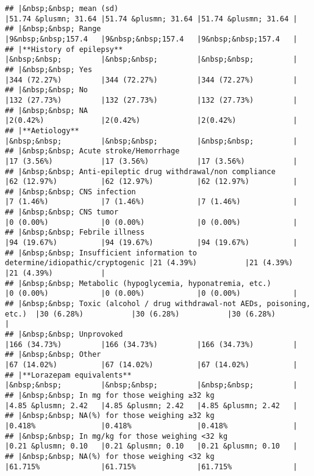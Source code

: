 \documentclass[
]{article}
\begin{document}
\begin{verbatim}
## |&nbsp;&nbsp; mean (sd)                                                    |51.74 &plusmn; 31.64 |51.74 &plusmn; 31.64 |51.74 &plusmn; 31.64 |
## |&nbsp;&nbsp; Range                                                        |9&nbsp;&nbsp;157.4   |9&nbsp;&nbsp;157.4   |9&nbsp;&nbsp;157.4   |
## |**History of epilepsy**                                                   |&nbsp;&nbsp;         |&nbsp;&nbsp;         |&nbsp;&nbsp;         |
## |&nbsp;&nbsp; Yes                                                          |344 (72.27%)         |344 (72.27%)         |344 (72.27%)         |
## |&nbsp;&nbsp; No                                                           |132 (27.73%)         |132 (27.73%)         |132 (27.73%)         |
## |&nbsp;&nbsp; NA                                                           |2(0.42%)             |2(0.42%)             |2(0.42%)             |
## |**Aetiology**                                                             |&nbsp;&nbsp;         |&nbsp;&nbsp;         |&nbsp;&nbsp;         |
## |&nbsp;&nbsp; Acute stroke/Hemorrhage                                      |17 (3.56%)           |17 (3.56%)           |17 (3.56%)           |
## |&nbsp;&nbsp; Anti-epileptic drug withdrawal/non compliance                |62 (12.97%)          |62 (12.97%)          |62 (12.97%)          |
## |&nbsp;&nbsp; CNS infection                                                |7 (1.46%)            |7 (1.46%)            |7 (1.46%)            |
## |&nbsp;&nbsp; CNS tumor                                                    |0 (0.00%)            |0 (0.00%)            |0 (0.00%)            |
## |&nbsp;&nbsp; Febrile illness                                              |94 (19.67%)          |94 (19.67%)          |94 (19.67%)          |
## |&nbsp;&nbsp; Insufficient information to determine/idiopathic/cryptogenic |21 (4.39%)           |21 (4.39%)           |21 (4.39%)           |
## |&nbsp;&nbsp; Metabolic (hypoglycemia, hyponatremia, etc.)                 |0 (0.00%)            |0 (0.00%)            |0 (0.00%)            |
## |&nbsp;&nbsp; Toxic (alcohol / drug withdrawal-not AEDs, poisoning, etc.)  |30 (6.28%)           |30 (6.28%)           |30 (6.28%)           |
## |&nbsp;&nbsp; Unprovoked                                                   |166 (34.73%)         |166 (34.73%)         |166 (34.73%)         |
## |&nbsp;&nbsp; Other                                                        |67 (14.02%)          |67 (14.02%)          |67 (14.02%)          |
## |**Lorazepam equivalents**                                                 |&nbsp;&nbsp;         |&nbsp;&nbsp;         |&nbsp;&nbsp;         |
## |&nbsp;&nbsp; In mg for those weighing ≥32 kg                              |4.85 &plusmn; 2.42   |4.85 &plusmn; 2.42   |4.85 &plusmn; 2.42   |
## |&nbsp;&nbsp; NA(%) for those weighing ≥32 kg                              |0.418%               |0.418%               |0.418%               |
## |&nbsp;&nbsp; In mg/kg for those weighing <32 kg                           |0.21 &plusmn; 0.10   |0.21 &plusmn; 0.10   |0.21 &plusmn; 0.10   |
## |&nbsp;&nbsp; NA(%) for those weighing <32 kg                              |61.715%              |61.715%              |61.715%              |
\end{verbatim}
\end{document}
